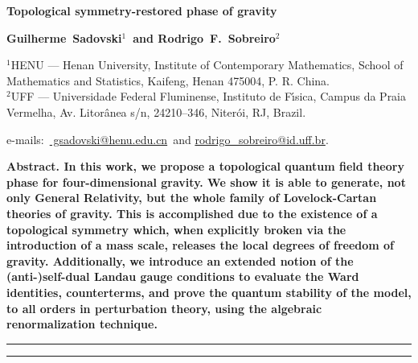 \documentclass[main.tex]{subfiles}
\begin{document}
\thispagestyle{empty}
{
\noindent
\Large
\bfseries
Topological symmetry-restored phase of gravity
\bigskip
\bigskip
}

{
\noindent
\bfseries
Guilherme~Sadovski${}^{1}${\normalfont~and}
Rodrigo~F.~Sobreiro${}^{2}$
\bigskip
}

{
\noindent
\footnotesize
${}^{1}$HENU --- Henan University, Institute of Contemporary Mathematics, School of Mathematics and Statistics, Kaifeng, Henan 475004, P. R. China. \\
${}^{2}$UFF --- Universidade Federal Fluminense, Instituto de F{\'{\i}}sica, Campus da Praia Vermelha, Av. Litor{\^{a}}nea s/n, 24210--346, Niter{\'{o}}i, RJ, Brazil.
\bigskip
\bigskip
}

{
\noindent
\footnotesize
\rmfamily
e-mails:~\href{
  mailto:gsadovski@henu.edu.cn}{
  gsadovski@henu.edu.cn}{\normalfont~and}
\href{
  mailto:rodrigo\_sobreiro@id.uff.br
}{
  rodrigo\_sobreiro@id.uff.br}{\normalfont.}
\bigskip
}

{
\noindent
\bfseries
Abstract.
\normalfont{}
In this work, we propose a topological quantum field theory phase for four-dimensional gravity. We show it is able to generate, not only General Relativity, but the whole family of Lovelock-Cartan theories of gravity. This is accomplished due to the existence of a topological symmetry which, when explicitly broken via the introduction of a mass scale, releases the local degrees of freedom of gravity. Additionally, we introduce an extended notion of the (anti-){}self-dual Landau gauge conditions to evaluate the Ward identities, counterterms, and prove the quantum stability of the model, to all orders in perturbation theory, using the algebraic renormalization technique.
\bigskip
}

{
\noindent
\rule{\textwidth}{1pt}
\tableofcontents
\smallskip
\noindent
\rule{\linewidth}{1pt}
}
\end{document}
